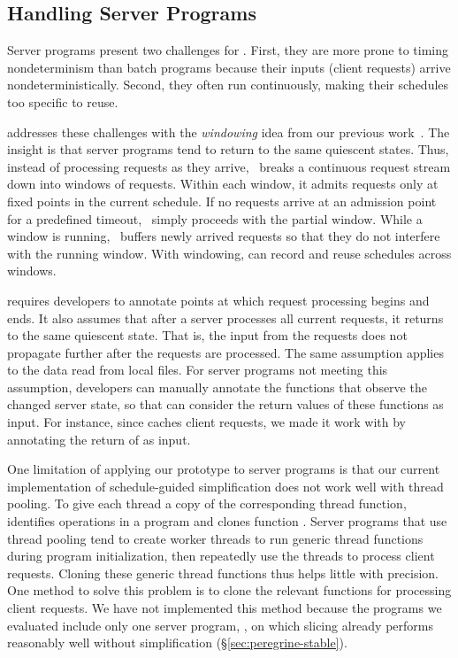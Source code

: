 \subsection{Handling Server Programs} \label{sec:peregrine-window}

Server programs present two challenges for \peregrine.  First, they are more
prone to timing nondeterminism than batch programs because their inputs
(client requests) arrive nondeterministically.  Second, they often run
continuously, making their schedules too specific to reuse.  

\peregrine addresses these challenges with the \emph{windowing} idea from our
previous work~\cite{cui:tern:osdi10}.  The insight is that server programs
tend to return to the same quiescent states.  Thus, instead of processing
requests as they arrive, \peregrine\ breaks a continuous request stream down into
windows of requests.  Within each window, it admits requests only at fixed
points in the current schedule.  If no requests arrive at an admission
point for a predefined timeout, \peregrine\ simply proceeds with the partial
window.  While a window is running, \peregrine\ buffers newly arrived requests
so that they do not interfere with the running window.  With windowing,
\peregrine can record and reuse schedules across windows.

\peregrine requires developers to annotate points at which request processing begins and
ends.  It also assumes that after a server processes all current requests,
it returns to the same quiescent state.  That is, the input from
the requests does not propagate further after the requests are processed.
The same assumption applies to the data read from local files.
For server programs not meeting this assumption, developers can manually
annotate the functions that observe the changed server state, so that \peregrine
can consider the return values of these functions as input.
For instance, since \apache caches client requests, we made it work with \peregrine
by annotating the return of  as input.

One limitation of applying our \peregrine prototype to server programs is that our current
implementation of schedule-guided simplification does not work well with
thread pooling.  To give each thread a copy of the corresponding thread
function, \peregrine identifies  operations in
a program and clones function .  Server programs that use
thread pooling tend to create worker threads to run generic thread
functions during program initialization, then repeatedly use the threads
to process client requests.  Cloning these generic thread functions thus
helps little with precision.  One method to solve this problem is to clone
the relevant functions for processing client requests.  We have not
implemented this method because the programs we evaluated include only one server
program, \apache, on which slicing already performs reasonably well
without simplification (\S\ref{sec:peregrine-stable}).


